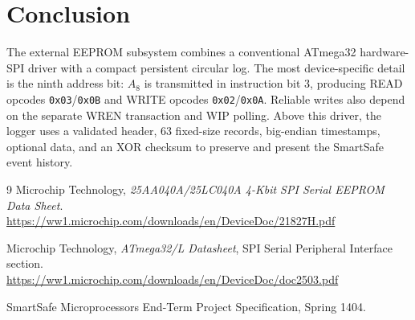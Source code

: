 \documentclass[11pt,a4paper]{article}
\begin{document}
\section{Conclusion}
The external EEPROM subsystem combines a conventional ATmega32 hardware-SPI driver with a compact persistent circular log. The most device-specific detail is the ninth address bit: $A_8$ is transmitted in instruction bit 3, producing READ opcodes \texttt{0x03}/\texttt{0x0B} and WRITE opcodes \texttt{0x02}/\texttt{0x0A}. Reliable writes also depend on the separate WREN transaction and WIP polling. Above this driver, the logger uses a validated header, 63 fixed-size records, big-endian timestamps, optional data, and an XOR checksum to preserve and present the SmartSafe event history.

\begin{thebibliography}{9}
Microchip Technology, \emph{25AA040A/25LC040A 4-Kbit SPI Serial EEPROM Data Sheet}.\\
\url{https://ww1.microchip.com/downloads/en/DeviceDoc/21827H.pdf}

Microchip Technology, \emph{ATmega32/L Datasheet}, SPI Serial Peripheral Interface section.\\
\url{https://ww1.microchip.com/downloads/en/DeviceDoc/doc2503.pdf}

SmartSafe Microprocessors End-Term Project Specification, Spring 1404.
\end{thebibliography}
\end{document}
